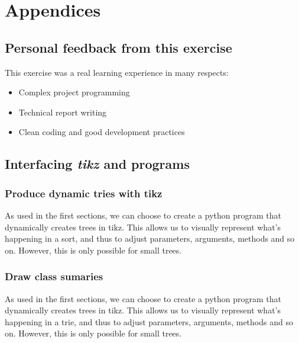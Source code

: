 \documentclass[10pt,a4paper,hidelinks]{article}
\begin{document}
\section{Appendices}
\subsection{Personal feedback from this exercise}
This exercise was a real learning experience in many respects:
\begin{itemize}
    \item Complex project programming
    \item Technical report writing
    \item Clean coding and good development practices
\end{itemize}

\subsection{Interfacing \textit{tikz} and programs}
\subsubsection{Produce dynamic tries with tikz}
As used in the first sections, we can choose to create a python program that dynamically creates trees in tikz. This allows us to visually represent what's happening in a sort, and thus to adjust parameters, arguments, methods and so on. However, this is only possible for small trees.

\subsubsection{Draw class sumaries}
As used in the first sections, we can choose to create a python program that dynamically creates trees in tikz. This allows us to visually represent what's happening in a trie, and thus to adjust parameters, arguments, methods and so on. However, this is only possible for small trees.




\newpage
\listoffigures
\lstlistoflistings
\listoftables
\end{document}
